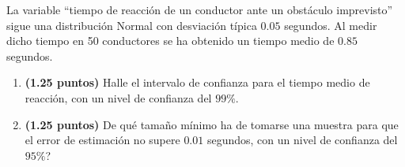 
La variable ``tiempo de reacción de un conductor ante un obstáculo imprevisto'' sigue una distribución Normal con desviación típica $0.05$ segundos. Al medir dicho tiempo en 50 conductores se ha obtenido un tiempo medio de $0.85$ segundos.
\begin{enumerate}[label=\alph*)]
\item \textbf{(1.25 puntos)} Halle el intervalo de confianza para el tiempo medio de reacción, con un nivel de confianza del $99\%$.
\item \textbf{(1.25 puntos)} \textquestiondown{}De qué tamaño mínimo ha de tomarse una muestra para que el error de estimación no supere $0.01$ segundos, con un nivel de confianza del $95\%$?
\end{enumerate}
